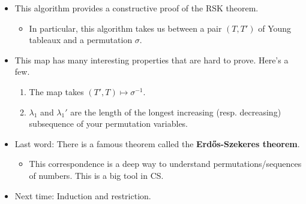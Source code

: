 \documentclass[../notes.tex]{subfiles}
\begin{document}
\begin{itemize}
    \item This algorithm provides a constructive proof of the RSK theorem.
    \begin{itemize}
        \item In particular, this algorithm takes us between a pair $(T,T')$ of Young tableaux and a permutation $\sigma$.
    \end{itemize}
    \item This map has many interesting properties that are hard to prove. Here's a few.
    \begin{enumerate}
        \item The map takes $(T',T)\mapsto\sigma^{-1}$.
        \item $\lambda_1$ and $\lambda_1'$ are the length of the longest increasing (resp. decreasing) subsequence of your permutation variables.
    \end{enumerate}
    \item Last word: There is a famous theorem called the \textbf{Erd\H{o}s-Szekeres theorem}.
    \begin{itemize}
        \item This correspondence is a deep way to understand permutations/sequences of numbers. This is a big tool in CS.
    \end{itemize}
    \item Next time: Induction and restriction.
\end{itemize}
\end{document}
